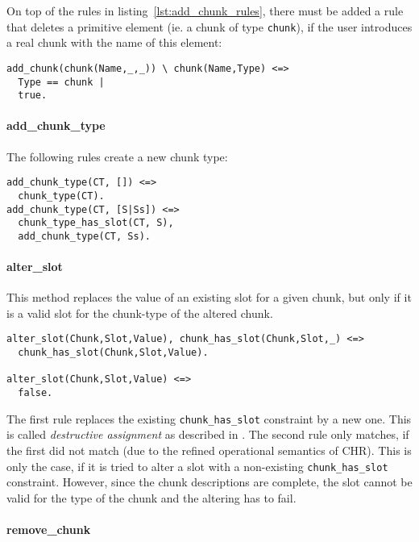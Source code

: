 On top of the rules in listing~\ref{lst:add_chunk_rules}, there must be added a rule that deletes a primitive element (ie. a chunk of type \verb|chunk|), if the user introduces a real chunk with the name of this element:

\begin{lstlisting}[caption={Clean up primitive elements}]  
% delete chunk of Type chunk, if real chunk is added
add_chunk(chunk(Name,_,_)) \ chunk(Name,Type) <=> 
  Type == chunk |
  true.
\end{lstlisting}


\paragraph{add\_chunk\_type}

The following rules create a new chunk type:

\begin{lstlisting}[caption={rules for \texttt{add\_chunk\_type}}]
add_chunk_type(CT, []) <=> 
  chunk_type(CT).
add_chunk_type(CT, [S|Ss]) <=> 
  chunk_type_has_slot(CT, S), 
  add_chunk_type(CT, Ss).
\end{lstlisting}

\paragraph{alter\_slot}

This method replaces the value of an existing slot for a given chunk, but only if it is a valid slot for the chunk-type of the altered chunk.

\begin{lstlisting}
alter_slot(Chunk,Slot,Value), chunk_has_slot(Chunk,Slot,_) <=>
  chunk_has_slot(Chunk,Slot,Value).
  
alter_slot(Chunk,Slot,Value) <=>
  false.
\end{lstlisting}

The first rule replaces the existing \verb|chunk_has_slot| constraint by a new one. This is called \emph{destructive assignment} as described in \cite[32]{fru_chr_book_2009}. The second rule only matches, if the first did not match (due to the refined operational semantics of CHR). This is only the case, if it is tried to alter a slot with a non-existing \verb|chunk_has_slot| constraint. However, since the chunk descriptions are complete, the slot cannot be valid for the type of the chunk and the altering has to fail.

\paragraph{remove\_chunk}


